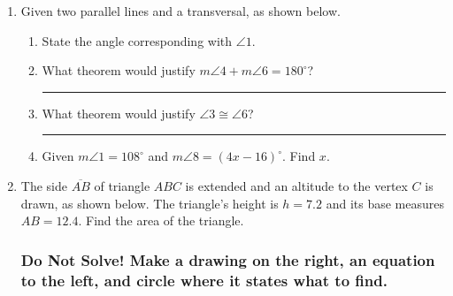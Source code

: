 \documentclass[12pt, twoside]{article}
\begin{document}
\begin{enumerate}
  \item Given two parallel lines and a transversal, as shown below.
  \begin{center}
  \end{center}
  \begin{enumerate}
    \item State the angle corresponding with $\angle 1$. \vspace{0.5cm}
    \item What theorem would justify $m\angle 4 + m\angle 6 =180^\circ$? \rule{5cm}{0.15mm} \vspace{0.5cm}
    \item What theorem would justify $\angle 3 \cong \angle 6$? \rule{7cm}{0.15mm} \vspace{0.5cm}
    \item Given $m\angle 1 = 108^\circ$ and $m\angle 8 = (4x-16)^\circ$. Find $x$. \vspace{4.5cm}
  \end{enumerate}

  \item The side $\overline{AB}$ of triangle $ABC$ is extended and an altitude to the vertex $C$ is drawn, as shown below. The triangle's height is $h=7.2$ and its base measures $AB=12.4$. Find the area of the triangle.
    \begin{flushright}
    \end{flushright}

\newpage   
\subsubsection*{Do Not Solve! Make a drawing on the right, an equation to the left, and circle where it states what to find.}
\vspace{0.5cm}
  

\end{enumerate}
\end{document}
